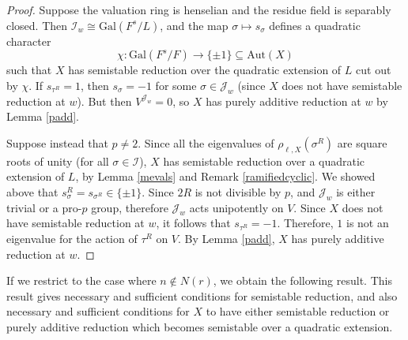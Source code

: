 \documentclass{amsart}
\def\Gal{\mathrm{Gal}}
\def\Aut{\mathrm{Aut}}
\def\I{{\mathcal I}}
\def\J{{\mathcal J}}
\theoremstyle{definition}
\begin{document}
\begin{proof}
Suppose the valuation ring is henselian and the residue field is 
separably closed. Then $\I_{w} \cong \Gal(F^{s}/L)$, 
and the map $\sigma \mapsto s_{\sigma}$
defines a quadratic character 
$$\chi : \Gal(F^s/F) \to \{\pm 1\} \subseteq \Aut(X)$$
such that $X$ has semistable reduction over the quadratic extension
of $L$ cut out by $\chi$.
If $s_{\tau^R}=1$, then $s_\sigma=-1$ for some $\sigma\in\J_w$
(since $X$ does not have semistable reduction at $w$).
But then $V^{\J_w}=0$, so $X$ has purely additive 
reduction at $w$ by Lemma \ref{padd}.

Suppose instead that $p \ne 2$.
Since all the eigenvalues of $\rho_{\ell,X}(\sigma^{R})$
are square roots of unity (for all $\sigma \in \I$), 
$X$ has semistable reduction 
over a quadratic extension of $L$, by Lemma \ref{mevals} and
Remark \ref{ramifiedcyclic}.
We showed above that $s_{\sigma}^{R} = s_{\sigma^{R}} \in \{\pm 1\}$.
Since $2R$ is not divisible by $p$, and 
$\J_{w}$ is either trivial or a pro-$p$ group, 
therefore $\J_{w}$ acts unipotently on $V$.
Since $X$ does not have semistable reduction at $w$,
it follows that $s_{\tau^{R}}=-1$.
Therefore, $1$ is not an eigenvalue for the action of $\tau^{R}$
on $V$. By Lemma \ref{padd}, 
$X$ has purely additive reduction at $w$.
\end{proof}

If we restrict to the case where $n \notin N(r)$, we obtain
the following result. This result gives necessary and sufficient
conditions for semistable reduction, and also necessary and
sufficient conditions for $X$ to have either semistable reduction
or purely additive reduction which becomes semistable over a
quadratic extension.
\end{document}
